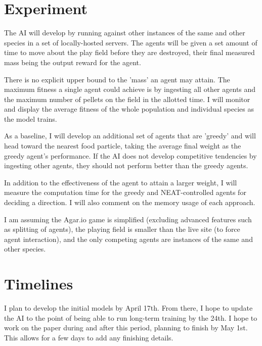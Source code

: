 \documentclass[11pt]{article}
\begin{document}
\section*{Experiment}

The AI will develop by running against other instances of the same and other species in a set of locally-hosted servers. The agents will be given a set amount of time to move about the play field before they are destroyed, their final measured mass being the output reward for the agent.

There is no explicit upper bound to the 'mass' an agent may attain. The maximum fitness a single agent could achieve is by ingesting all other agents and the maximum number of pellets on the field in the allotted time. I will monitor and display the average fitness of the whole population and individual species as the model trains.

As a baseline, I will develop an additional set of agents that are 'greedy' and will head toward the nearest food particle, taking the average final weight as the greedy agent's performance. If the AI does not develop competitive tendencies by ingesting other agents, they should not perform better than the greedy agents.

In addition to the effectiveness of the agent to attain a larger weight, I will measure the computation time for the greedy and NEAT-controlled agents for deciding a direction. I will also comment on the memory usage of each approach. 

I am assuming the Agar.io game is simplified (excluding advanced features such as splitting of agents), the playing field is smaller than the live site (to force agent interaction), and the only competing agents are instances of the same and other species.

\section*{Timelines}

I plan to develop the initial models by April 17th. From there, I hope to update the AI to the point of being able to run long-term training by the 24th. I hope to work on the paper during and after this period, planning to finish by May 1st. This allows for a few days to add any finishing details.


% 

\end{document}
